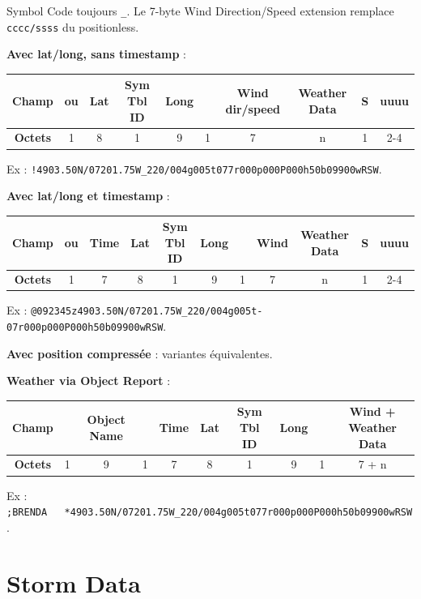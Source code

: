 Symbol Code toujours \texttt{\_}. Le 7-byte Wind Direction/Speed
extension remplace \texttt{cccc/ssss} du positionless.

\textbf{Avec lat/long, sans timestamp} :

\begin{center}
\begin{tabular}{|c|c|c|c|c|c|c|c|c|c|}
\hline
\textbf{Champ} & \lit{!} ou \lit{=} & Lat & Sym Tbl ID & Long & \lit{\_} & Wind dir/speed & Weather Data & S & uuuu \\
\hline
\textbf{Octets} & 1 & 8 & 1 & 9 & 1 & 7 & n & 1 & 2-4 \\
\hline
\end{tabular}
\end{center}

Ex :
\texttt{!4903.50N/07201.75W\_220/004g005t077r000p000P000h50b09900wRSW}.

\textbf{Avec lat/long et timestamp} :

\begin{center}
\begin{tabular}{|c|c|c|c|c|c|c|c|c|c|c|}
\hline
\textbf{Champ} & \lit{/} ou \lit{@} & Time & Lat & Sym Tbl ID & Long & \lit{\_} & Wind & Weather Data & S & uuuu \\
\hline
\textbf{Octets} & 1 & 7 & 8 & 1 & 9 & 1 & 7 & n & 1 & 2-4 \\
\hline
\end{tabular}
\end{center}

Ex :
\texttt{@092345z4903.50N/07201.75W\_220/004g005t-07r000p000P000h50b09900wRSW}.

\textbf{Avec position compressée} : variantes équivalentes.

\textbf{Weather via Object Report} :

\begin{center}
\begin{tabular}{|c|c|c|c|c|c|c|c|c|c|}
\hline
\textbf{Champ} & \lit{;} & Object Name & \lit{*} & Time & Lat & Sym Tbl ID & Long & \lit{\_} & Wind + Weather Data \\
\hline
\textbf{Octets} & 1 & 9 & 1 & 7 & 8 & 1 & 9 & 1 & 7 + n \\
\hline
\end{tabular}
\end{center}

Ex :
\texttt{;BRENDA\ \ \ *4903.50N/07201.75W\_220/004g005t077r000p000P000h50b09900wRSW}.

\section{Storm Data}\label{storm-data}

